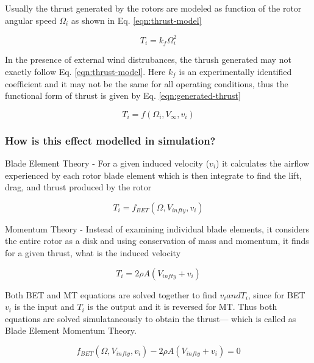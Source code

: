 \documentclass[11pt,a4paper]{article}
\begin{document}
	Usually the thrust generated by the rotors are modeled as function of  the rotor angular speed $\Omega_i$ as shown in Eq. \ref{eqn:thrust-model}
	
	\begin{equation}
		\label{eqn:thrust-model}
		T_i = k_f \Omega_i^2
	\end{equation}
	
	In the presence of external wind distrubances, the thrush generated may not exactly follow Eq. \ref{eqn:thrust-model}. Here $k_f$ is an experimentally identified coefficient and it may not be the same for all operating conditions, thus the functional form of thrust is given by Eq. \ref{eqn:generated-thrust}
	
	\begin{equation}
		T_i = f(\Omega_i, V_{\infty}, v_i)
		\label{eqn:generated-thrust}
	\end{equation}
	
	\subsubsection{How is this effect modelled in simulation?}
	
	Blade Element Theory - For a given induced velocity ($v_i$) it calculates the airflow experienced by each rotor blade element which is then integrate to find the lift, drag, and thrust produced by the rotor
	
	\begin{equation}
		T_i = f_{BET}(\Omega, V_{infty}, v_i)
	\end{equation}
	
	Momentum Theory - Instead of examining individual blade elements, it considers the entire rotor as a disk and using conservation of mass and momentum, it finds for a given thrust, what is the induced velocity
	
	\begin{equation}
		T_i = 2 \rho A (V_{infty} + v_i)
	\end{equation}
	
	Both BET and MT equations are solved together to find $v_i and T_i$, since for BET $v_i$  is the input and $T_i$ is the output and it is reversed for MT. Thus both equations are solved simulataneously to obtain the thrust--- which is called as Blade Element Momentum Theory.
		
	\begin{equation}
		f_{BET}(\Omega, V_{infty}, v_i) -  2 \rho A (V_{infty} + v_i) = 0
	\end{equation}
	
\end{document}

